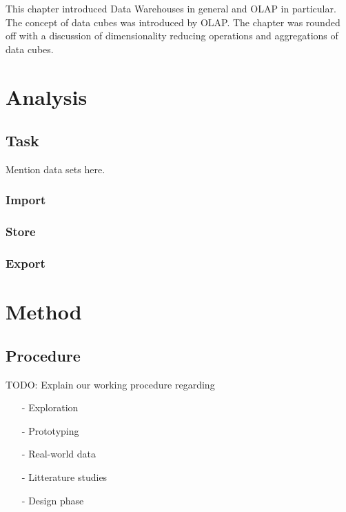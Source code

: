 This chapter introduced Data Warehouses in general and OLAP in particular. The
concept of data cubes was introduced by OLAP. The chapter was rounded off with
a discussion of dimensionality reducing operations and aggregations of data
cubes.



\chapter{Analysis}



\section{Task}

Mention data sets here.


\subsection{Import}

\subsection{Store}

\subsection{Export}




\chapter{Method}

\section{Procedure}

TODO: Explain our working procedure regarding
\begin{itemize}
\item[-] Exploration
\item[-] Prototyping
\item[-] Real-world data
\item[-] Litterature studies
\item[-] Design phase
\end{itemize}



